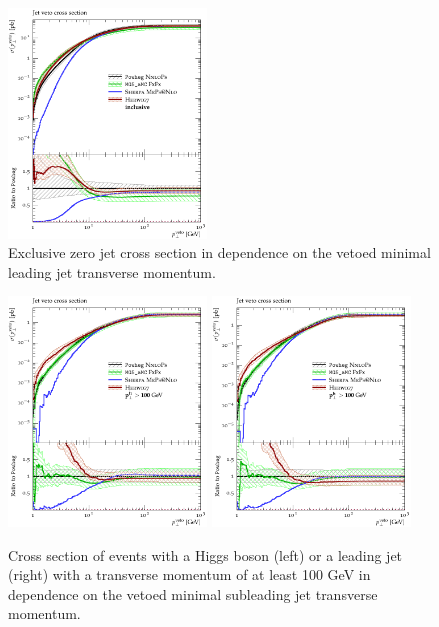 \begin{figure}[t!]
  \centering
  \includegraphics[width=0.47\textwidth]{figures/hjetscomp_xs_jet_veto_j0.pdf}
  \caption{
    Exclusive zero jet cross section in dependence on the vetoed minimal 
    leading jet transverse momentum.
    \label{fig:higgscomp:results:jvobs:jvxs0}
  }
\end{figure}


\begin{figure}[t!]
  \centering
  \includegraphics[width=0.47\textwidth]{figures/hjetscomp_xs_jet_veto_j1_100.pdf}
  \quad
  \includegraphics[width=0.47\textwidth]{figures/hjetscomp_xs_jet_veto_h_100.pdf}
  \caption{
    Cross section of events with a Higgs boson (left) or a leading jet (right)
    with a transverse momentum of at least 100 GeV in dependence on the 
    vetoed minimal subleading jet transverse momentum.
    \label{fig:higgscomp:results:1obs:jvxs1h_jvxs1j}
  }
\end{figure}

